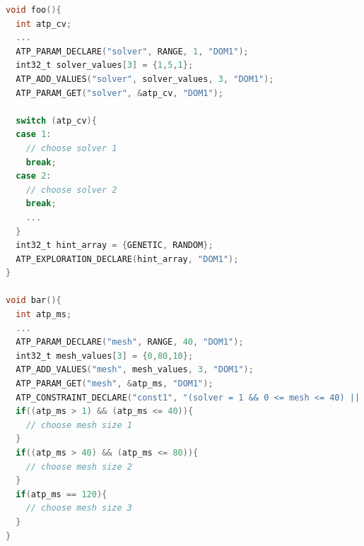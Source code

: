 %	
%	

\begin{lstlisting}[language=C,xleftmargin=3em,frame=none,title=\phantom{xxx},caption=ATP constraint and exploration declaration with the ATP library.,label=lbl:atp_example]
void foo(){
  int atp_cv;
  ...
  ATP_PARAM_DECLARE("solver", RANGE, 1, "DOM1");
  int32_t solver_values[3] = {1,5,1};
  ATP_ADD_VALUES("solver", solver_values, 3, "DOM1");
  ATP_PARAM_GET("solver", &atp_cv, "DOM1");
	
  switch (atp_cv){
  case 1:
    // choose solver 1
    break;
  case 2:
    // choose solver 2
    break;
    ...
  }
  int32_t hint_array = {GENETIC, RANDOM};
  ATP_EXPLORATION_DECLARE(hint_array, "DOM1");
}
	
void bar(){
  int atp_ms;
  ...
  ATP_PARAM_DECLARE("mesh", RANGE, 40, "DOM1");
  int32_t mesh_values[3] = {0,80,10};
  ATP_ADD_VALUES("mesh", mesh_values, 3, "DOM1");
  ATP_PARAM_GET("mesh", &atp_ms, "DOM1");
  ATP_CONSTRAINT_DECLARE("const1", "(solver = 1 && 0 <= mesh <= 40) || (solver = 2 && 40 <= mesh <= 80) || (solver > 2 && mesh = 120)", "DOM1");
  if((atp_ms > 1) && (atp_ms <= 40)){
    // choose mesh size 1
  }
  if((atp_ms > 40) && (atp_ms <= 80)){
    // choose mesh size 2
  }
  if(atp_ms == 120){
    // choose mesh size 3
  }
}
\end{lstlisting}

